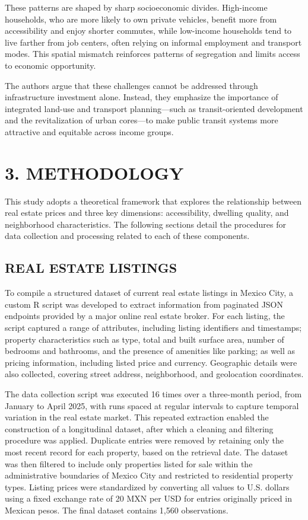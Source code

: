 \documentclass[
  12pt,
]{report}
\begin{document}
These patterns are shaped by sharp socioeconomic divides. High-income
households, who are more likely to own private vehicles, benefit more
from accessibility and enjoy shorter commutes, while low-income
households tend to live farther from job centers, often relying on
informal employment and transport modes. This spatial mismatch
reinforces patterns of segregation and limits access to economic
opportunity.

The authors argue that these challenges cannot be addressed through
infrastructure investment alone. Instead, they emphasize the importance
of integrated land-use and transport planning---such as transit-oriented
development and the revitalization of urban cores---to make public
transit systems more attractive and equitable across income groups.

\newpage

\chapter{3. METHODOLOGY}\label{methodology}

This study adopts a theoretical framework that explores the relationship
between real estate prices and three key dimensions: accessibility,
dwelling quality, and neighborhood characteristics. The following
sections detail the procedures for data collection and processing
related to each of these components.

\section{REAL ESTATE LISTINGS}\label{real-estate-listings}

To compile a structured dataset of current real estate listings in
Mexico City, a custom R script was developed to extract information from
paginated JSON endpoints provided by a major online real estate broker.
For each listing, the script captured a range of attributes, including
listing identifiers and timestamps; property characteristics such as
type, total and built surface area, number of bedrooms and bathrooms,
and the presence of amenities like parking; as well as pricing
information, including listed price and currency. Geographic details
were also collected, covering street address, neighborhood, and
geolocation coordinates.

The data collection script was executed 16 times over a three-month
period, from January to April 2025, with runs spaced at regular
intervals to capture temporal variation in the real estate market. This
repeated extraction enabled the construction of a longitudinal dataset,
after which a cleaning and filtering procedure was applied. Duplicate
entries were removed by retaining only the most recent record for each
property, based on the retrieval date. The dataset was then filtered to
include only properties listed for sale within the administrative
boundaries of Mexico City and restricted to residential property types.
Listing prices were standardized by converting all values to U.S.
dollars using a fixed exchange rate of 20 MXN per USD for entries
originally priced in Mexican pesos. The final dataset contains 1,560
observations.
\end{document}
